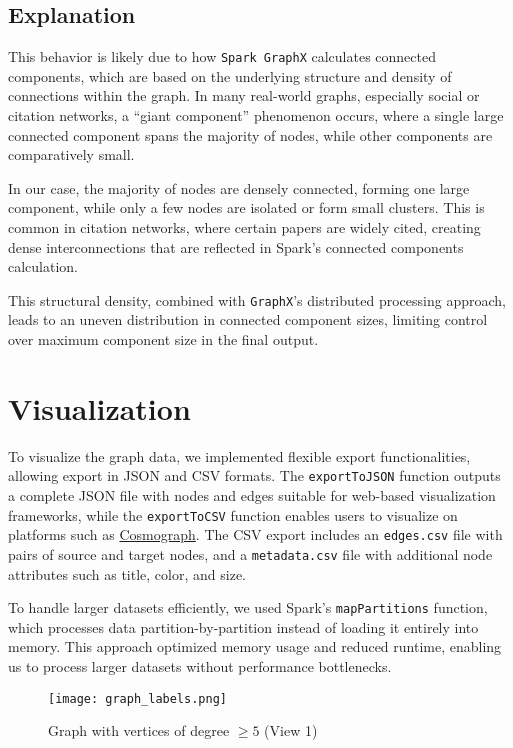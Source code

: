 \documentclass[a4paper, 11pt]{article}
\begin{document}
\subsection{Explanation}

This behavior is likely due to how \texttt{Spark GraphX} calculates connected components, which are based on the underlying structure and density of connections within the graph. In many real-world graphs, especially social or citation networks, a “giant component” phenomenon occurs, where a single large connected component spans the majority of nodes, while other components are comparatively small. 

In our case, the majority of nodes are densely connected, forming one large component, while only a few nodes are isolated or form small clusters. This is common in citation networks, where certain papers are widely cited, creating dense interconnections that are reflected in Spark's connected components calculation. 

This structural density, combined with \texttt{GraphX}'s distributed processing approach, leads to an uneven distribution in connected component sizes, limiting control over maximum component size in the final output.



\section{Visualization}

To visualize the graph data, we implemented flexible export functionalities, allowing export in JSON and CSV formats. The \texttt{exportToJSON} function outputs a complete JSON file with nodes and edges suitable for web-based visualization frameworks, while the \texttt{exportToCSV} function enables users to visualize on platforms such as \href{https://cosmograph.app/}{Cosmograph}. The CSV export includes an \texttt{edges.csv} file with pairs of source and target nodes, and a \texttt{metadata.csv} file with additional node attributes such as title, color, and size.

To handle larger datasets efficiently, we used Spark’s \texttt{mapPartitions} function, which processes data partition-by-partition instead of loading it entirely into memory. This approach optimized memory usage and reduced runtime, enabling us to process larger datasets without performance bottlenecks.

\begin{figure}[h!]
    \centering
    \texttt{[image: graph\_labels.png]} %
    \caption{Graph with vertices of degree $\geq 5$ (View 1)}
    \label{fig:graph_view1}
\end{figure}
\end{document}
